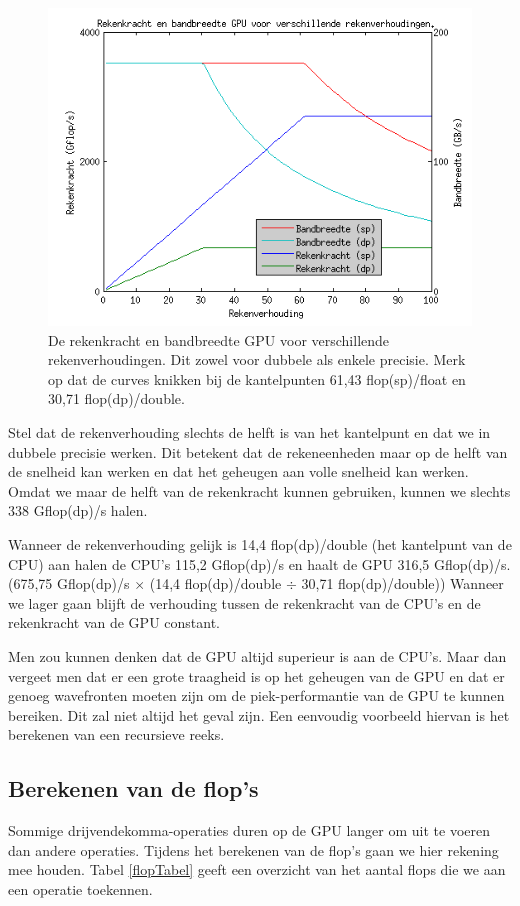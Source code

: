 \begin{figure}
\centering
\includegraphics{kantelpunt}
\caption{\label{kantelpunt}De rekenkracht en bandbreedte GPU voor verschillende rekenverhoudingen. Dit zowel voor dubbele als enkele precisie. Merk op dat de curves knikken bij de kantelpunten 61,43 flop(sp)/float en 30,71 flop(dp)/double.}
\end{figure}

Stel dat de rekenverhouding slechts de helft is van het kantelpunt en dat we in dubbele precisie werken. Dit betekent dat de rekeneenheden maar op de helft van de snelheid kan werken en dat het geheugen aan volle snelheid kan werken. Omdat we maar de helft van de rekenkracht kunnen gebruiken, kunnen we slechts 338 Gflop(dp)/s halen.

Wanneer de rekenverhouding gelijk is 14,4 flop(dp)/double (het kantelpunt van de CPU) aan halen de CPU's 115,2 Gflop(dp)/s en haalt de GPU 316,5 Gflop(dp)/s. (675,75 Gflop(dp)/s $\times$ (14,4 flop(dp)/double $\div$ 30,71 flop(dp)/double)) Wanneer we lager gaan blijft de verhouding tussen de rekenkracht van de CPU's en de rekenkracht van de GPU constant.

Men zou kunnen denken dat de GPU altijd superieur is aan de CPU's. Maar dan vergeet men dat er een grote traagheid is op het geheugen van de GPU en dat er genoeg wavefronten moeten zijn om de piek-performantie van de GPU te kunnen bereiken. Dit zal niet altijd het geval zijn. Een eenvoudig voorbeeld hiervan is het berekenen van een recursieve reeks.

\subsection{Berekenen van de flop's}
Sommige drijvendekomma-operaties duren op de GPU langer om uit te voeren dan andere operaties. Tijdens het berekenen van de flop's gaan we hier rekening mee houden. Tabel \ref{flopTabel} geeft een overzicht van het aantal flops die we aan een operatie toekennen.

